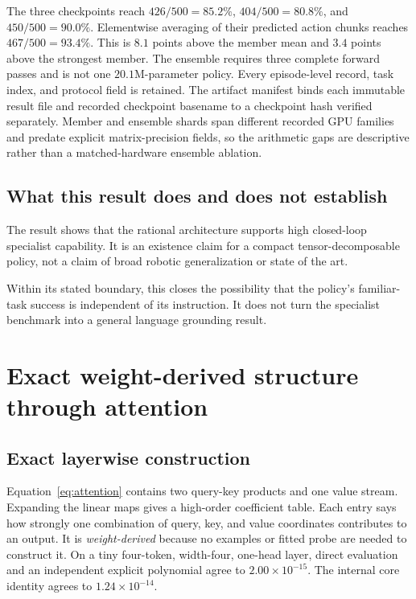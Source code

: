 \documentclass{article}
\begin{document}
The three checkpoints reach $426/500=85.2\%$, $404/500=80.8\%$, and $450/500=90.0\%$.
Elementwise averaging of their predicted action chunks reaches $467/500=93.4\%$. This is $8.1$
points above the member mean and $3.4$ points above the strongest member. The ensemble requires
three complete forward passes and is not one $20.1$M-parameter policy. Every episode-level record,
task index, and protocol field is retained. The artifact manifest binds each immutable result file
and recorded checkpoint basename to a checkpoint hash verified separately. Member and ensemble
shards span different recorded GPU families and predate explicit matrix-precision fields, so the
arithmetic gaps are descriptive rather than a matched-hardware ensemble ablation.

\subsection{What this result does and does not establish}

The result shows that the rational architecture supports high closed-loop specialist
capability. It is an existence claim for a compact tensor-decomposable
policy, not a claim of broad robotic generalization or state of the art.





Within its stated boundary, this closes the possibility that the policy's familiar-task success is
independent of its instruction. It does not turn the specialist benchmark into a general language
grounding result.

\section{Exact weight-derived structure through attention}
\label{sec:exactattention}

\subsection{Exact layerwise construction}

Equation~\ref{eq:attention} contains two query-key products and one value stream. Expanding
the linear maps gives a high-order coefficient table. Each entry says how strongly one
combination of query, key, and value coordinates contributes to an output. It is
\emph{weight-derived} because no examples or fitted probe are needed to construct it. On a
tiny four-token, width-four, one-head layer, direct evaluation
and an independent explicit polynomial agree to $2.00\times10^{-15}$. The internal core
identity agrees to $1.24\times10^{-14}$.
\end{document}
